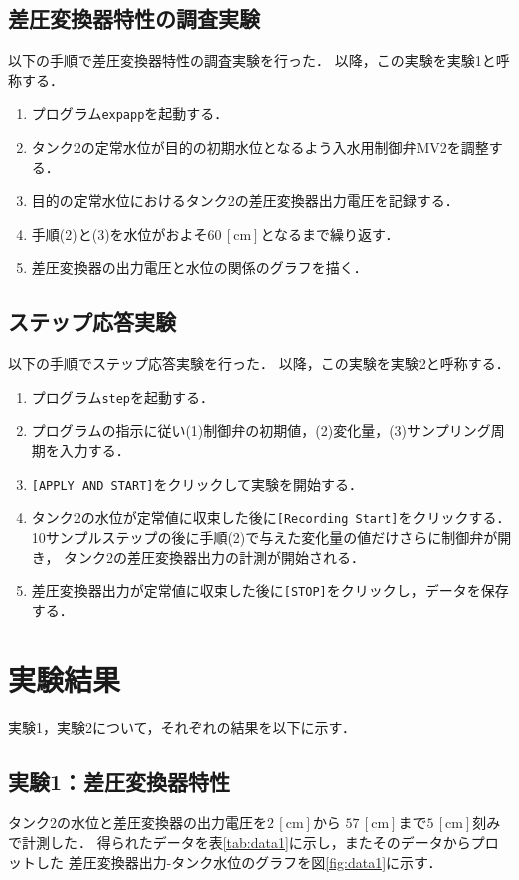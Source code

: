\documentclass[11pt,a4paper]{jsarticle}
\begin{document}
  \subsection{差圧変換器特性の調査実験}
    以下の手順で差圧変換器特性の調査実験を行った．
    以降，この実験を実験1と呼称する．
    \begin{enumerate}
      \item プログラム\texttt{expapp}を起動する．
      \item タンク2の定常水位が目的の初期水位となるよう入水用制御弁MV2を調整する．
      \item 目的の定常水位におけるタンク2の差圧変換器出力電圧を記録する．
      \item 手順(2)と(3)を水位がおよそ$60 \, \mathrm{[cm]}$となるまで繰り返す．
      \item 差圧変換器の出力電圧と水位の関係のグラフを描く．
    \end{enumerate}
  
  \subsection{ステップ応答実験}
    以下の手順でステップ応答実験を行った．
    以降，この実験を実験2と呼称する．
    \begin{enumerate}
      \item プログラム\texttt{step}を起動する．
      \item プログラムの指示に従い(1)制御弁の初期値，(2)変化量，(3)サンプリング周期を入力する．
      \item \texttt{[APPLY AND START]}をクリックして実験を開始する．
      \item タンク2の水位が定常値に収束した後に\texttt{[Recording Start]}をクリックする．
            10サンプルステップの後に手順(2)で与えた変化量の値だけさらに制御弁が開き，
            タンク2の差圧変換器出力の計測が開始される．
      \item 差圧変換器出力が定常値に収束した後に\texttt{[STOP]}をクリックし，データを保存する．
    \end{enumerate}

\section{実験結果}
  \setcounter{equation}{0}
  \setcounter{figure}{0}
  \setcounter{table}{0}

  実験1，実験2について，それぞれの結果を以下に示す．

  \subsection{実験1：差圧変換器特性}
    タンク2の水位と差圧変換器の出力電圧を$2 \,\mathrm{[cm]}$から
    $57 \,\mathrm{[cm]}$まで$5 \,\mathrm{[cm]}$刻みで計測した．
    得られたデータを表\ref{tab:data1}に示し，またそのデータからプロットした
    差圧変換器出力-タンク水位のグラフを図\ref{fig:data1}に示す．
    
\end{document}
